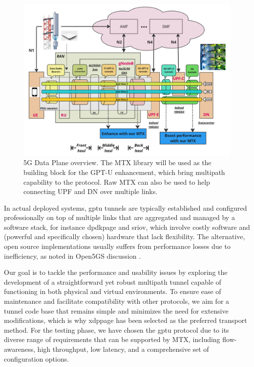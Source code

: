 \begin{figure}[H]
	\centering
	\includegraphics[width=1.0\textwidth]{resources/images/5g_dp_enhancement.PNG}
	\caption{5G Data Plane overview. The MTX library will be used as the building block for the GPT-U enhancement, which bring multipath capability to the protocol. Raw MTX can also be used to help connecting UPF and DN over multiple links.}
    \label{fig:related_work:5g_dp_enhancement}
\end{figure}

In actual deployed systems, \ac{gptu} tunnels are typically established and configured professionally on top of multiple links that are aggregated and managed by a software stack, for instance \ac{dpdkpage} and \ac{sriov}, which involve costly software and (powerful and specifically chosen) hardware that lack flexibility.
The alternative, open source implementations usually suffers from performance losses due to inefficiency, as noted in Open5GS discussion \cite{open5gs_github_udp_perf_cap}\cite{open5gs_github_dpdk}.

Our goal is to tackle the performance and usability issues by exploring the development of a straightforward yet robust multipath tunnel capable of functioning in both physical and virtual environments. 
To ensure ease of maintenance and facilitate compatibility with other protocols, we aim for a tunnel code base that remains simple and minimizes the need for extensive modifications, which is why \ac{xdppage} has been selected as the preferred transport method.
For the testing phase, we have chosen the \ac{gptu} protocol due to its diverse range of requirements that can be supported by MTX, including flow-awareness, high throughput, low latency, and a comprehensive set of configuration options.


